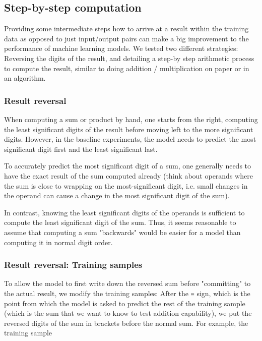 \subsection{Step-by-step computation}
\label{stepbystep}

Providing some intermediate steps how to arrive at a result within the training data as opposed to just input/output pairs can make a big improvement to the performance of machine learning models. We tested two different strategies: Reversing the digits of the result, and detailing a step-by step arithmetic process to compute the result, similar to doing addition / multiplication on paper or in an algorithm.

\subsubsection{Result reversal}
\label{resultreversal}

When computing a sum or product by hand, one starts from the right, computing the least significant digits of the result before moving left to the more significant digits. However, in the baseline experiments, the model needs to predict the most significant digit first and the least significant last.

To accurately predict the most significant digit of a sum, one generally needs to have the exact result of the sum computed already (think about operands where the sum is close to wrapping on the most-significant digit, i.e. small changes in the operand can cause a change in the most significant digit of the sum).

In contrast, knowing the least significant digits of the operands is sufficient to compute the least significant digit of the sum. Thus, it seems reasonable to assume that computing a sum "backwards" would be easier for a model than computing it in normal digit order.

\subsubsection{Result reversal: Training samples}

To allow the model to first write down the reversed sum before "committing" to the actual result, we modify the training samples: After the \verb|=| sign, which is the point from which the model is asked to predict the rest of the training sample (which is the sum that we want to know to test addition capability), we put the reversed digits of the sum in brackets before the normal sum.
For example, the training sample


